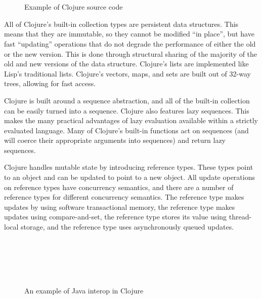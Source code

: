 \documentclass[12pt]{article}
\begin{document}
\begin{figure}
\raggedright
{}\\
\\
\\
\code{~~[coll]}\\
\\
\\
\code{~~~~~~~~~~\{\}}\\
\caption{Example of Clojure source code}
\label{fig:source}
\end{figure}

All of Clojure's built-in collection types are persistent data structures.
This means that they are immutable, so they cannot be modified ``in place'', 
but have fast ``updating'' operations that do
not degrade the performance of either the old or the new version. This is done through
structural sharing of the majority of the old and new versions of the data
structure. Clojure's lists are
implemented like Lisp's traditional lists. Clojure's vectors, maps, and sets are
built out of 32-way trees, allowing for fast access.

Clojure is built around a sequence abstraction, and all of the built-in
collection can be easily turned into a sequence. Clojure also features lazy
sequences. This makes the many practical advantages of lazy evaluation available within a strictly evaluated language. Many of Clojure's built-in
functions act on sequences (and will coerce their appropriate arguments into
sequences) and return lazy sequences.

Clojure handles mutable state by introducing reference types. These types point to an
object and can be updated to point to a new object. All update operations on
reference types have concurrency semantics, and there are a number of reference
types for different concurrency semantics. The  reference type makes
updates by using software transactional memory, the  reference type
makes updates using compare-and-set, the  reference type stores its
value using thread-local storage, and the  reference type uses
asynchronously queued updates.

\begin{figure}
\raggedright
{}\\
\\
\\
\\
\caption{An example of Java interop in Clojure}
\label{fig:interop}
\end{figure}
\end{document}
